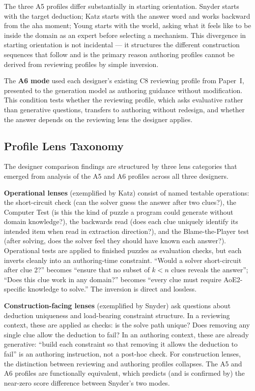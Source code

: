 The three A5 profiles differ substantially in starting orientation. Snyder starts with the target deduction; Katz starts with the answer word and works backward from the aha moment; Young starts with the world, asking what it feels like to be inside the domain as an expert before selecting a mechanism. This divergence in starting orientation is not incidental --- it structures the different construction sequences that follow and is the primary reason authoring profiles cannot be derived from reviewing profiles by simple inversion.

The \textbf{A6 mode} used each designer's existing C8 reviewing profile from Paper~I, presented to the generation model as authoring guidance without modification. This condition tests whether the reviewing profile, which asks evaluative rather than generative questions, transfers to authoring without redesign, and whether the answer depends on the reviewing lens the designer applies.

\subsection{Profile Lens Taxonomy}
\label{sec:lens-taxonomy}

The designer comparison findings are structured by three lens categories that emerged from analysis of the A5 and A6 profiles across all three designers.

\textbf{Operational lenses} (exemplified by Katz) consist of named testable operations: the short-circuit check (can the solver guess the answer after two clues?), the Computer Test (is this the kind of puzzle a program could generate without domain knowledge?), the backwards read (does each clue uniquely identify its intended item when read in extraction direction?), and the Blame-the-Player test (after solving, does the solver feel they should have known each answer?). Operational tests are applied to finished puzzles as evaluation checks, but each inverts cleanly into an authoring-time constraint. ``Would a solver short-circuit after clue 2?'' becomes ``ensure that no subset of $k < n$ clues reveals the answer''; ``Does this clue work in any domain?'' becomes ``every clue must require AoE2-specific knowledge to solve.'' The inversion is direct and lossless.

\textbf{Construction-facing lenses} (exemplified by Snyder) ask questions about deduction uniqueness and load-bearing constraint structure. In a reviewing context, these are applied as checks: is the solve path unique? Does removing any single clue allow the deduction to fail? In an authoring context, these are already generative: ``build each constraint so that removing it allows the deduction to fail'' is an authoring instruction, not a post-hoc check. For construction lenses, the distinction between reviewing and authoring profiles collapses. The A5 and A6 profiles are functionally equivalent, which predicts (and is confirmed by) the near-zero score difference between Snyder's two modes.


